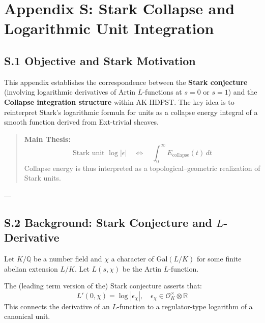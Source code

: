 \documentclass[11pt]{article}
\begin{document}
\begin{axiom}
\begin{axiom}
{{\begin{center}
\end{center}



\section*{Appendix S: Stark Collapse and Logarithmic Unit Integration}

\subsection*{S.1 Objective and Stark Motivation}

This appendix establishes the correspondence between the \textbf{Stark conjecture} (involving logarithmic derivatives of Artin $L$-functions at $s=0$ or $s=1$) and the \textbf{Collapse integration structure} within AK-HDPST.  
The key idea is to reinterpret Stark's logarithmic formula for units as a collapse energy integral of a smooth function derived from Ext-trivial sheaves.

\begin{quote}
\textbf{Main Thesis:}  
\[
\text{Stark unit } \log |\epsilon| \quad \Longleftrightarrow \quad \int_0^\infty E_{\text{collapse}}(t)\, dt
\]
Collapse energy is thus interpreted as a topological–geometric realization of Stark units.
\end{quote}

---

\subsection*{S.2 Background: Stark Conjecture and $L$-Derivative}

Let $K/\mathbb{Q}$ be a number field and $\chi$ a character of $\mathrm{Gal}(L/K)$ for some finite abelian extension $L/K$.  
Let $L(s, \chi)$ be the Artin $L$-function.

The (leading term version of the) Stark conjecture asserts that:
\[
L'(0, \chi) = \log |\epsilon_\chi|, \quad \epsilon_\chi \in \mathcal{O}_K^\times \otimes \mathbb{R}
\]
This connects the derivative of an $L$-function to a regulator-type logarithm of a canonical unit.

}}
\end{axiom}
\end{axiom}
\end{document}
